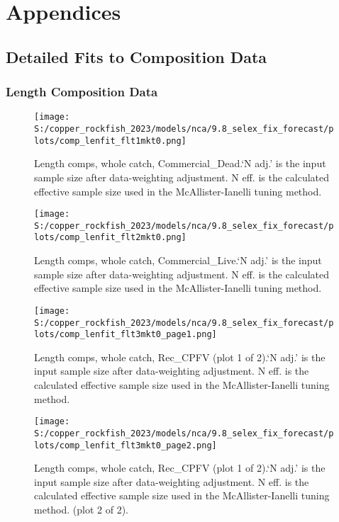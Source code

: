 \documentclass[11pt,
  english,
  letterpaper,
]{article}
\begin{document}
\pagebreak

\hypertarget{appendices}{%
\section{Appendices}\label{appendices}}

\hypertarget{detailed-fit-comps}{%
\subsection{Detailed Fits to Composition Data}\label{detailed-fit-comps}}

\hypertarget{length-data}{%
\subsubsection{Length Composition Data}\label{length-data}}

\begin{figure}
\centering
\texttt{[image: S:/copper\_rockfish\_2023/models/nca/9.8\_selex\_fix\_forecast/plots/comp\_lenfit\_flt1mkt0.png]}
\caption{Length comps, whole catch, Commercial\_Dead.`N adj.' is the input sample size after data-weighting adjustment. N eff. is the calculated effective sample size used in the McAllister-Ianelli tuning method.\label{fig:comp_lenfit_flt1mkt0}}
\end{figure}

\begin{figure}
\centering
\texttt{[image: S:/copper\_rockfish\_2023/models/nca/9.8\_selex\_fix\_forecast/plots/comp\_lenfit\_flt2mkt0.png]}
\caption{Length comps, whole catch, Commercial\_Live.`N adj.' is the input sample size after data-weighting adjustment. N eff. is the calculated effective sample size used in the McAllister-Ianelli tuning method.\label{fig:comp_lenfit_flt2mkt0}}
\end{figure}

\begin{figure}
\centering
\texttt{[image: S:/copper\_rockfish\_2023/models/nca/9.8\_selex\_fix\_forecast/plots/comp\_lenfit\_flt3mkt0\_page1.png]}
\caption{Length comps, whole catch, Rec\_CPFV (plot 1 of 2).`N adj.' is the input sample size after data-weighting adjustment. N eff. is the calculated effective sample size used in the McAllister-Ianelli tuning method.\label{fig:comp_lenfit_flt3mkt0_page1}}
\end{figure}

\begin{figure}
\centering
\texttt{[image: S:/copper\_rockfish\_2023/models/nca/9.8\_selex\_fix\_forecast/plots/comp\_lenfit\_flt3mkt0\_page2.png]}
\caption{Length comps, whole catch, Rec\_CPFV (plot 1 of 2).`N adj.' is the input sample size after data-weighting adjustment. N eff. is the calculated effective sample size used in the McAllister-Ianelli tuning method. (plot 2 of 2).\label{fig:comp_lenfit_flt3mkt0_page2}}
\end{figure}
\end{document}
